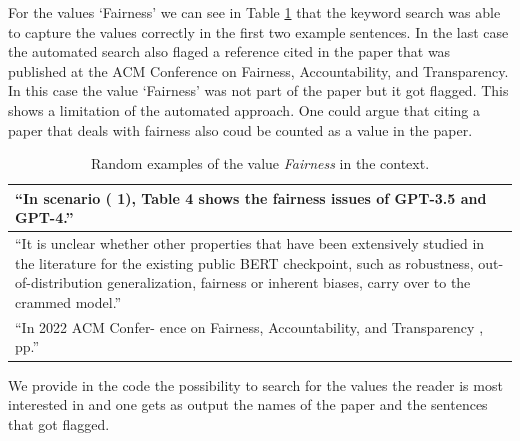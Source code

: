 \documentclass{article}
\begin{document}
For the values `Fairness' we can see in Table \ref{tab:qualitative_examples_fairness} that the keyword search was able to capture the values correctly in the first two example sentences.
In the last case the automated search also flaged a reference cited in the paper that was published at the ACM Conference on Fairness, Accountability, and Transparency. 
In this case the value `Fairness' was not part of the paper but it got flagged. This shows a limitation of the automated approach. One could argue that citing a paper that deals with fairness
also coud be counted as a value in the paper.  


\begin{table}[H]
    \centering
    \begin{tabular}{p{12cm}}
        \toprule
        ``In scenario ( 1), Table 4 shows the fairness issues of GPT-3.5 and GPT-4.'' \\
        \midrule
        ``It is unclear whether other properties that have been extensively studied in the literature for the existing public BERT checkpoint, such as robustness, out-of-distribution generalization, fairness or inherent biases, carry over to the crammed model.'' \\
        \midrule
        ``In 2022 ACM Confer- ence on Fairness, Accountability, and Transparency , pp.'' \\
        \bottomrule
    \end{tabular}
    \caption{Random examples of the value \textit{Fairness} in the context.}
    \label{tab:qualitative_examples_fairness}
\end{table}

We provide in the code the possibility to search for the values the reader is most interested in and one gets 
as output the names of the paper and the sentences that got flagged. 
\end{document}
